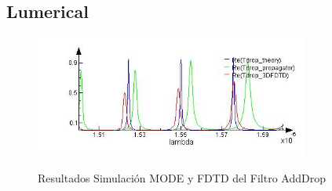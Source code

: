 \subsection{Lumerical}
\label{ss:lumerical}

\begin{figure}[h!]
\caption{Resultados Simulación MODE y FDTD del Filtro AddDrop}
\centering
\includegraphics[width=0.8\textwidth,natwidth=519,natheight=233]{figs/lum_T_drop.jpg}
\label{fig:lum_results_ad}
\end{figure} 

